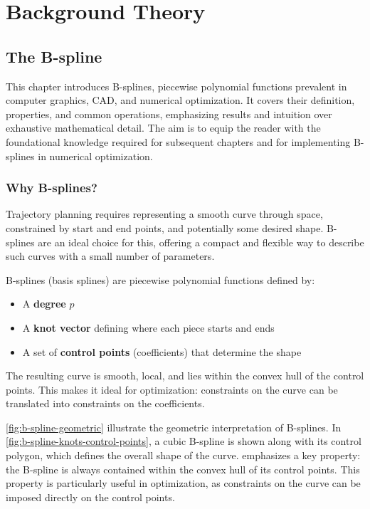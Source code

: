 
\chapter{Background Theory}\label{chap:background-theory}

\section{The B-spline}
\label{sec:b-spline-theory}
This chapter introduces B-splines, piecewise polynomial functions prevalent in computer graphics, CAD, and numerical optimization. It covers their definition, properties, and common operations, emphasizing results and intuition over exhaustive mathematical detail. The aim is to equip the reader with the foundational knowledge required for subsequent chapters and for implementing B-splines in numerical optimization.


\subsection{Why B-splines?}

Trajectory planning requires representing a smooth curve through space, constrained by start and end points, and potentially some desired shape. B-splines are an ideal choice for this, offering a compact and flexible way to describe such curves with a small number of parameters.

B-splines (basis splines) are piecewise polynomial functions defined by:
\begin{itemize}
    \item A \textbf{degree} \( p \)
    \item A \textbf{knot vector} defining where each piece starts and ends
    \item A set of \textbf{control points} (coefficients) that determine the shape
\end{itemize}

The resulting curve is smooth, local, and lies within the convex hull of the control points. This makes it ideal for optimization: constraints on the curve can be translated into constraints on the coefficients.


\cref{fig:b-spline-geometric} illustrate the geometric interpretation of B-splines. In \cref{fig:b-spline-knots-control-points}, a cubic B-spline is shown along with its control polygon, which defines the overall shape of the curve.  emphasizes a key property: the B-spline is always contained within the convex hull of its control points. This property is particularly useful in optimization, as constraints on the curve can be imposed directly on the control points.


